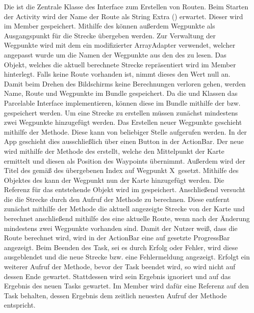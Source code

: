 Die  ist die Zentrale Klasse des Interface zum Erstellen von Routen. Beim Starten der Activity wird der Name der Route als String Extra () erwartet. Dieser wird im Member  gespeichert. Mithilfe des  können außerdem Wegpunkte als Ausgangspunkt für die Strecke übergeben werden. Zur Verwaltung der Wegpunkte wird mit dem  ein modifizierter ArrayAdapter verwendet, welcher angepasst wurde um die Namen der Wegpunkte aus den  des  zu lesen. Das  Objekt, welches die aktuell berechnete Strecke repräsentiert wird im Member  hinterlegt. Falls keine Route vorhanden ist, nimmt dieses den Wert null an. Damit beim Drehen des Bildschirms keine Berechnungen verloren gehen, werden Name, Route und Wegpunkte im Bundle gespeichert. Da die  und  Klassen das Parcelable Interface implementieren, können diese im Bundle mithilfe der  bzw.  gespeichert werden. Um eine Strecke zu erstellen müssen zunächst mindestens zwei Wegpunkte hinzugefügt werden. Das Erstellen neuer Wegpunkte geschieht mithilfe der  Methode. Diese kann von beliebiger Stelle aufgerufen werden. In der App geschieht dies ausschließlich über einen Button in der ActionBar. Der neue  wird mithilfe der  Methode des  erstellt, welche den Mittelpunkt der Karte ermittelt und diesen als Position des Waypoints übernimmt. Außerdem wird der Titel des  gemäß des übergebenen Index auf \glqq Wegpunkt X\grqq\ gesetzt. Mithilfe des  Objektes des  kann der Wegpunkt nun der Karte hinzugefügt werden. Die Referenz für das entstehende  Objekt wird im  gespeichert. Anschließend versucht die  die Strecke durch den Aufruf der  Methode zu berechnen. Diese entfernt zunächst mithilfe der  Methode die aktuell angezeigte Strecke von der Karte und berechnet anschließend mithilfe des  eine aktuelle Route, wenn nach der Änderung mindestens zwei Wegpunkte vorhanden sind. Damit der Nutzer weiß, dass die Route berechnet wird, wird in der ActionBar eine auf  gesetzte ProgressBar angezeigt. Beim Beenden des Task, sei es durch Erfolg oder Fehler, wird diese ausgeblendet und die neue Strecke bzw. eine Fehlermeldung angezeigt. Erfolgt ein weiterer Aufruf der Methode, bevor der Task beendet wird, so wird nicht auf dessen Ende gewartet. Stattdessen wird sein Ergebnis ignoriert und auf das Ergebnis des neuen Tasks gewartet. Im Member  wird dafür eine Referenz auf den Task behalten, dessen Ergebnis dem zeitlich neuesten Aufruf der  Methode entspricht. 

